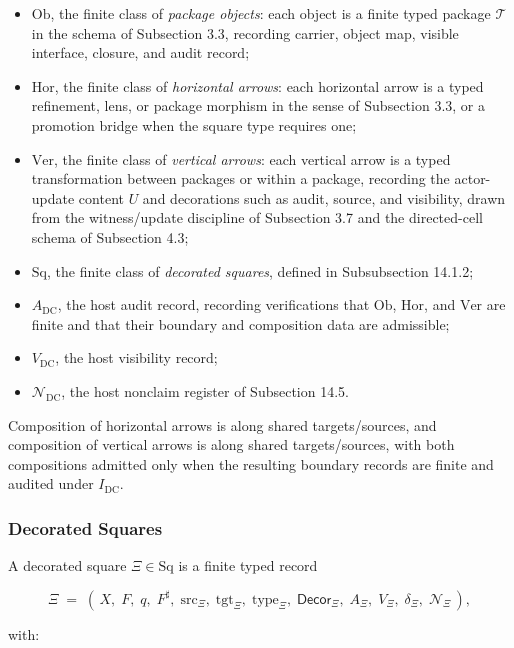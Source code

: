 \documentclass[11pt]{article}
\providecommand{\tightlist}{}
\theoremstyle{definition}
\begin{document}
\begin{itemize}
\tightlist
\item
  \(\mathrm{Ob}\), the finite class of \emph{package objects}: each object is a finite typed package \(\mathcal T\) in the schema of Subsection 3.3, recording carrier, object map, visible interface, closure, and audit record;
\item
  \(\mathrm{Hor}\), the finite class of \emph{horizontal arrows}: each horizontal arrow is a typed refinement, lens, or package morphism in the sense of Subsection 3.3, or a promotion bridge when the square type requires one;
\item
  \(\mathrm{Ver}\), the finite class of \emph{vertical arrows}: each vertical arrow is a typed transformation between packages or within a package, recording the actor-update content \(U\) and decorations such as audit, source, and visibility, drawn from the witness/update discipline of Subsection 3.7 and the directed-cell schema of Subsection 4.3;
\item
  \(\mathrm{Sq}\), the finite class of \emph{decorated squares}, defined in Subsubsection 14.1.2;
\item
  \(A_{\mathrm{DC}}\), the host audit record, recording verifications that \(\mathrm{Ob}\), \(\mathrm{Hor}\), and \(\mathrm{Ver}\) are finite and that their boundary and composition data are admissible;
\item
  \(V_{\mathrm{DC}}\), the host visibility record;
\item
  \(\mathcal N_{\mathrm{DC}}\), the host nonclaim register of Subsection 14.5.
\end{itemize}

Composition of horizontal arrows is along shared targets/sources, and composition of vertical arrows is along shared targets/sources, with both compositions admitted only when the resulting boundary records are finite and audited under \(I_{\mathrm{DC}}\).

\subsubsection{Decorated Squares}

A decorated square \(\Xi\in\mathrm{Sq}\) is a finite typed record

\[
\Xi\;=\;(\,X,\;F,\;q,\;F^{\sharp},\;\mathrm{src}_{\Xi},\;\mathrm{tgt}_{\Xi},\;\mathrm{type}_{\Xi},\;\mathsf{Decor}_{\Xi},\;A_{\Xi},\;V_{\Xi},\;\delta_{\Xi},\;\mathcal N_{\Xi}\,),
\]

with:
\end{document}

